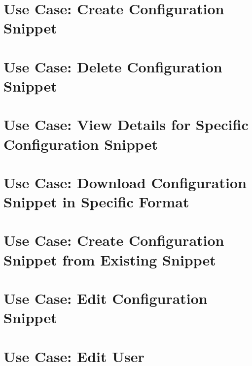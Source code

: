 \documentclass[twoside]{book}
\newcommand{\+}{\discretionary{\mbox{\scriptsize$\hookleftarrow$}}{}{}}
\begin{document}
\chapter{Use Case\+: Create Configuration Snippet}
\label{doc_usecases_snippet_sharing_UC_create_snippet_md}

\chapter{Use Case\+: Delete Configuration Snippet}
\label{doc_usecases_snippet_sharing_UC_delete_snippet_md}

\chapter{Use Case\+: View Details for Specific Configuration Snippet}
\label{doc_usecases_snippet_sharing_UC_details_snippet_md}

\chapter{Use Case\+: Download Configuration Snippet in Specific Format}
\label{doc_usecases_snippet_sharing_UC_download_snippet_md}

\chapter{Use Case\+: Create Configuration Snippet from Existing Snippet}
\label{doc_usecases_snippet_sharing_UC_duplicate_snippet_md}

\chapter{Use Case\+: Edit Configuration Snippet}
\label{doc_usecases_snippet_sharing_UC_edit_snippet_md}

\chapter{Use Case\+: Edit User}
\label{doc_usecases_snippet_sharing_UC_edit_user_md}

\end{document}
